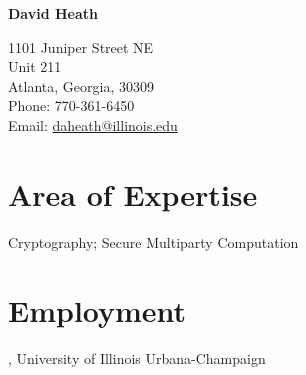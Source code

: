 \documentclass[11pt]{article}
\begin{document}
{\LARGE\bfseries David Heath}
\medskip\medskip

1101 Juniper Street NE\\
Unit 211\\
Atlanta, Georgia, 30309
\medskip\\
Phone: 770-361-6450\\
Email: \href{mailto:daheath@illinois.edu}{daheath@illinois.edu}

\section*{Area of Expertise}

Cryptography; Secure Multiparty Computation


\section*{Employment}

, University of Illinois Urbana-Champaign
\\
\end{document}
